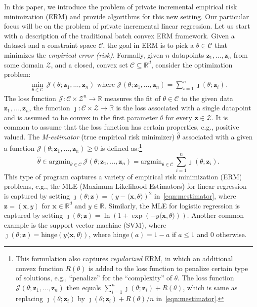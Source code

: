 \documentclass{article}
\theoremstyle{plain}
\def \hinge {\mathrm{hinge}}
\def \z {\mathbf z}
\def \CCC {\mathcal{C}}
\def \ZZZ {\mathcal{Z}}
\def \JJJ {\mathcal{J}}
\def \x {\mathbf x}
\def \R {\mathbb{R}}
\begin{document}
In this paper, we introduce the problem of private incremental empirical risk minimization (ERM) and provide algorithms for this new setting. Our particular focus will be on the problem of private incremental linear regression. Let us start with a description of the traditional batch convex ERM framework. Given a dataset and a constraint space $\CCC$, the goal in ERM is to pick a $\theta \in \CCC$ that minimizes the {\em empirical error (risk)}. Formally, given $n$ datapoints $\z_1,\dots,\z_n$ from some domain $\ZZZ$, and a closed, convex
set $\CCC \subseteq \R^d$, consider the optimization problem:
\begin{align} \label{eqn:mestimator}
 \min_{\theta \in \CCC}\, \JJJ(\theta;\z_1,\dots,\z_n) \mbox{ where } \JJJ(\theta;\z_1,\dots,\z_n)  =  \sum_{i=1}^n \jmath(\theta;\z_i).
\end{align}
The loss function $\JJJ : \CCC \times \ZZZ^n \rightarrow \R$ measures the fit of $\theta \in \CCC$ to the given data $\z_1,\dots,\z_n$, the function $\jmath : \CCC \times \ZZZ  \rightarrow \R$ is the loss associated with a single datapoint and is assumed to be convex in the first parameter $\theta$ for every $\z \in \ZZZ$. It is common to assume that the loss function has certain properties, e.g., positive valued. The {\em M-estimator} (true empirical risk minimizer) $\hat{\theta}$ associated with a given a function $\JJJ(\theta; \z_1,\dots,\z_n) \geq 0$ is defined as:\footnote{This formulation also captures {\em regularized} ERM, in which an additional convex function $R(\theta)$ is added to the loss function to penalize certain type of solutions, e.g., ``penalize'' for the ``complexity'' of $\theta$. The loss function $\JJJ(\theta; \z_1,\dots,\z_n)$ then equals $\sum_{i=1}^n \jmath (\theta; \z_i) + R(\theta)$, which is same as replacing $\jmath (\theta; \z_i)$ by $\jmath (\theta; \z_i) + R(\theta)/n$ in~\eqref{eqn:mestimator}.}
$$\hat{\theta} \in \mbox{argmin}_{\theta \in \CCC}\, \JJJ(\theta; \z_1,\dots,\z_n) = \mbox{argmin}_{\theta \in \CCC}\, \sum_{i=1}^n  \jmath (\theta; \z_i).$$
This type of program captures a variety of empirical risk minimization (ERM) problems, e.g., the MLE (Maximum Likelihood Estimators) for linear regression is captured by setting $\jmath(\theta;\z) = (y - \langle \x,\theta \rangle)^2$ in~\eqref{eqn:mestimator}, where $\z = (\x,y)$ for $\x \in \R^d$ and $y \in \R$. Similarly, the MLE for logistic regression is captured by setting $\jmath(\theta;\z) = \ln(1+\exp(-y\langle \x,\theta\rangle))$. Another common example is the support vector machine (SVM), where $\jmath(\theta;\z) = \hinge(y \langle \x,\theta \rangle)$, where $\hinge(a) = 1-a$ if $a \leq 1$ and $0$ otherwise. 
\end{document}

